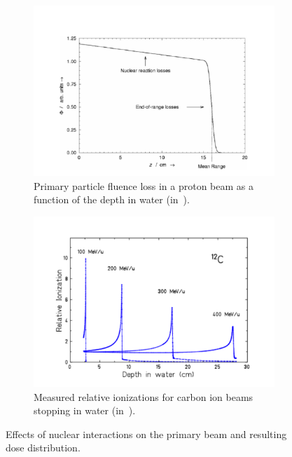 \begin{figure}
\begin{subfigure}[t]{.49\textwidth}
\centering
\includegraphics[width=0.99\linewidth]{03_GraphicFiles/chapter1_Introduction/primaryLoss.pdf}
\caption{Primary particle fluence loss in a pro\-ton beam as a function of the depth in water (in~\cite{Newhauser2015}).}
\label{chap1::fig::nuclearReacLoss}
\end{subfigure}
\begin{subfigure}[t]{.49\textwidth}
\centering
\includegraphics[width=0.92\linewidth]{03_GraphicFiles/chapter1_Introduction/tailBragg.pdf}	
\caption{Measured relative ionizations for car\-bon ion beams stopping in water (in~\cite{Schardt2008}).}
\label{chap1::fig::TailBragg}
\end{subfigure}
\caption{Effects of nuclear interactions on the primary beam and resulting dose distribution.}
\label{chap1::fig::NuclearInt}
\end{figure}

